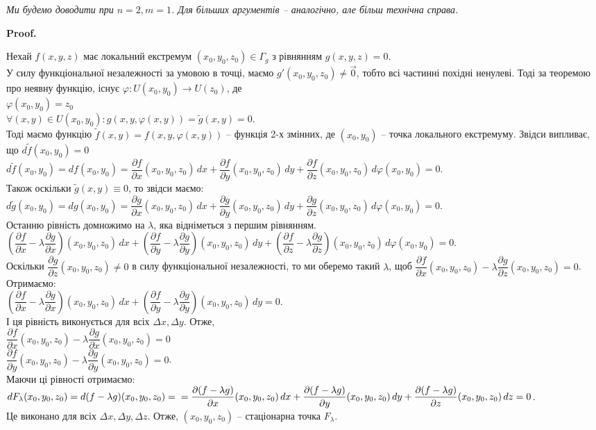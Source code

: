 \documentclass[a4paper, 10pt]{article}
\makeatletter
\def\departial#1#2{\dfrac{\partial {#1}}{\partial {#2}}}
\def\qed{$\blacksquare$}
\theoremstyle{theoremdd}
\theoremstyle{theoremdd}
\theoremstyle{theoremdd}
\theoremstyle{theoremdd}
\theoremstyle{theoremdd}
\theoremstyle{theoremdd}
\theoremstyle{theoremdd}
\theoremstyle{theoremdd}
\theoremstyle{theoremdd}
\renewenvironment{proof}[1][Proof.\\]{\par
\pushQED{\hfill \qed}%
\normalfont \topsep6\p@\@plus6\p@\relax
\trivlist
\item\relax
{\bfseries
#1\@addpunct{.}}\hspace\labelsep\ignorespaces
}{%
\popQED\endtrivlist\@endpefalse
}
\makeatother
\begin{document}
\textit{Ми будемо доводити при $n = 2, m = 1$. Для більших аргументів -- аналогічно, але більш технічна справа.}

\begin{proof}
Нехай $f(x,y,z)$ має локальний екстремум $(x_0,y_0,z_0) \in \Gamma_g$ з рівнянням $g(x,y,z) = 0$.\\
У силу функціональної незалежності за умовою в точці, маємо $g'(x_0,y_0,z_0) \neq \vec{0}$, тобто всі частинні похідні ненулеві. Тоді за теоремою про неявну функцію, існує $\varphi: U(x_0,y_0) \to U(z_0)$, де\\
$\varphi(x_0,y_0) = z_0$\\
$\forall (x,y) \in U(x_0,y_0): g(x,y,\varphi(x,y)) = \tilde{g}(x,y) = 0$.\\
Тоді маємо функцію $\tilde{f}(x,y) = f(x,y,\varphi(x,y))$ -- функція 2-х змінних, де $(x_0,y_0)$ -- точка локального екстремуму. Звідси випливає, що $d \tilde{f}(x_0,y_0) = 0$\\
$d\tilde{f}(x_0,y_0) = df(x_0,y_0) = \departial{f}{x}(x_0,y_0,z_0)\,dx + \departial{f}{y}(x_0,y_0,z_0)\,dy + \departial{f}{z}(x_0,y_0,z_0)\,d\varphi(x_0,y_0) = 0$.\\
Також оскільки $\tilde{g}(x,y) \equiv 0$, то звідси маємо:\\
$d\tilde{g}(x_0,y_0) = dg(x_0,y_0) = \departial{g}{x}(x_0,y_0,z_0)\,dx + \departial{g}{y}(x_0,y_0,z_0)\,dy + \departial{g}{z}(x_0,y_0,z_0)\,d\varphi(x_0,y_0) = 0$.\\
Останню рівність домножимо на $\lambda$, яка відніметься з першим рівнянням.\\
$\left( \departial{f}{x} - \lambda \departial{g}{x} \right)(x_0,y_0,z_0)\,dx + \left( \departial{f}{y} - \lambda \departial{g}{y} \right)(x_0,y_0,z_0)\,dy + \left( \departial{f}{z} - \lambda \departial{g}{z} \right)(x_0,y_0,z_0)\,d\varphi(x_0,y_0) = 0$.\\
Оскільки $\departial{g}{z}(x_0,y_0,z_0) \neq 0$ в силу функціональної незалежності, то ми оберемо такий $\lambda$, щоб $\departial{f}{x}(x_0,y_0,z_0) - \lambda \departial{g}{z}(x_0,y_0,z_0) = 0$. Отримаємо:\\
$\left( \departial{f}{x} - \lambda \departial{g}{x} \right)(x_0,y_0,z_0)\,dx + \left( \departial{f}{y} - \lambda \departial{g}{y} \right)(x_0,y_0,z_0)\,dy = 0$.\\
І ця рівність виконується для всіх $\Delta x, \Delta y$. Отже,\\
$\departial{f}{x}(x_0,y_0,z_0) - \lambda \departial{g}{x}(x_0,y_0,z_0) = 0$\\
$\departial{f}{y}(x_0,y_0,z_0) - \lambda \departial{g}{y}(x_0,y_0,z_0) = 0$.\\
Маючи ці рівності отримаємо:\\
$dF_{\lambda}(x_0,y_0,z_0) = d(f-\lambda g)(x_0,y_0,z_0) = \\ = \departial{(f-\lambda g)}{x}(x_0,y_0,z_0)\,dx + \departial{(f-\lambda g)}{y}(x_0,y_0,z_0)\,dy + \departial{(f-\lambda g)}{z}(x_0,y_0,z_0)\,dz = 0$.\\
Це виконано для всіх $\Delta x, \Delta y, \Delta z$. Отже, $(x_0,y_0,z_0)$ -- стаціонарна точка $F_\lambda$.
\end{proof}
\end{document}
